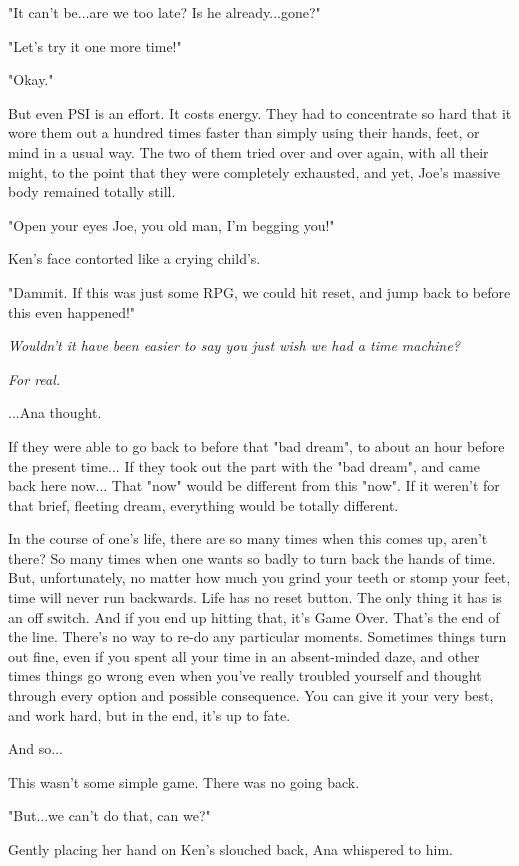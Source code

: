 \documentclass[
]{article}
\begin{document}
"It can't be...are we too late? Is he already...gone?"

"Let's try it one more time!"

"Okay."

But even PSI is an effort. It costs energy. They had to concentrate so
hard that it wore them out a hundred times faster than simply using
their hands, feet, or mind in a usual way. The two of them tried over
and over again, with all their might, to the point that they were
completely exhausted, and yet, Joe's massive body remained totally
still.

"Open your eyes Joe, you old man, I'm begging you!"

Ken's face contorted like a crying child's.

"Dammit. If this was just some RPG, we could hit reset, and jump back to
before this even happened!"

\emph{Wouldn't it have been easier to say you just wish we had a time
machine?}

\emph{For real.}

...Ana thought.

If they were able to go back to before that "bad dream", to about an
hour before the present time... If they took out the part with the "bad
dream", and came back here now... That "now" would be different from
this "now". If it weren't for that brief, fleeting dream, everything
would be totally different.

In the course of one's life, there are so many times when this comes up,
aren't there? So many times when one wants so badly to turn back the
hands of time. But, unfortunately, no matter how much you grind your
teeth or stomp your feet, time will never run backwards. Life has no
reset button. The only thing it has is an off switch. And if you end up
hitting that, it's Game Over. That's the end of the line. There's no way
to re-do any particular moments. Sometimes things turn out fine, even if
you spent all your time in an absent-minded daze, and other times things
go wrong even when you've really troubled yourself and thought through
every option and possible consequence. You can give it your very best,
and work hard, but in the end, it's up to fate.

And so...

This wasn't some simple game. There was no going back.

"But...we can't do that, can we?"

Gently placing her hand on Ken's slouched back, Ana whispered to him.
\end{document}
